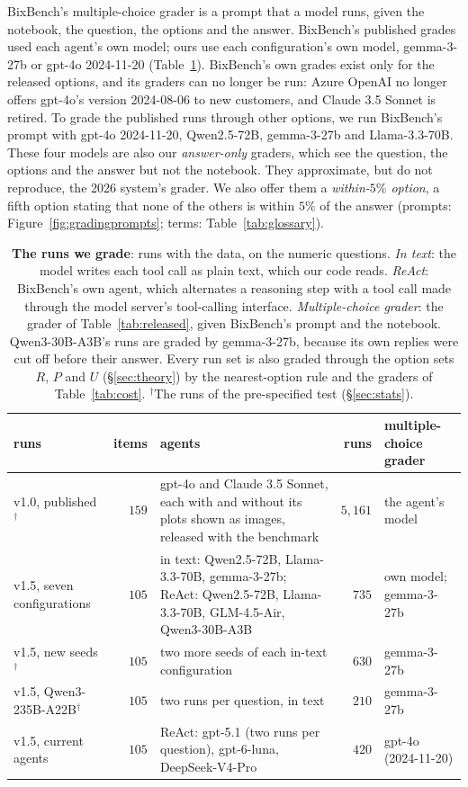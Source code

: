 \documentclass{article}
\begin{document}
BixBench's multiple-choice grader is a prompt that a model runs, given the notebook, the question, the options and the
answer. BixBench's published grades used each agent's own model; ours use each configuration's own model,
gemma-3-27b or gpt-4o 2024-11-20 (Table~\ref{tab:runs}). BixBench's own grades exist only for the released options,
and its graders can no longer be run: Azure OpenAI no longer offers gpt-4o's version 2024-08-06 to new customers,
and Claude 3.5 Sonnet is retired. To grade the published runs through other options, we run BixBench's prompt with gpt-4o 2024-11-20,
Qwen2.5-72B, gemma-3-27b and Llama-3.3-70B. These four models are also our \emph{answer-only} graders, which see the
question, the options and the answer but not the notebook. They approximate, but do not reproduce, the 2026 system's
grader. We also offer them a \emph{within-$5\%$ option}, a fifth option stating that none of the others is within
$5\%$ of the answer (prompts: Figure~\ref{fig:gradingprompts}; terms: Table~\ref{tab:glossary}).

\begin{table}[t]
\centering\footnotesize\setlength{\tabcolsep}{3pt}
\caption{\textbf{The runs we grade}: runs with the data, on the numeric questions. \emph{In text}: the model writes
each tool call as plain text, which our code reads. \emph{ReAct}: BixBench's own agent, which alternates a reasoning
step with a tool call made through the model server's tool-calling interface. \emph{Multiple-choice grader}: the
grader of Table~\ref{tab:released}, given BixBench's prompt and the notebook. Qwen3-30B-A3B's runs are graded by
gemma-3-27b, because its own replies were cut off before their answer. Every run set is also graded through the
option sets $R$, $P$ and $U$ (\S\ref{sec:theory}) by the nearest-option rule and the graders of
Table~\ref{tab:cost}. $^{\dagger}$The runs of the pre-specified test (\S\ref{sec:stats}).}
\label{tab:runs}
\begin{tabularx}{\linewidth}{@{}lr>{\raggedright\arraybackslash}Xrl@{}}
\toprule
runs & items & agents & runs & multiple-choice grader\\
\midrule
v1.0, published$^{\dagger}$ & $159$ & gpt-4o and Claude 3.5 Sonnet, each with and without its plots shown as
images, released with the benchmark & $5{,}161$ & the agent's model\\
v1.5, seven configurations & $105$ & in text: Qwen2.5-72B, Llama-3.3-70B, gemma-3-27b; ReAct: Qwen2.5-72B,
Llama-3.3-70B, GLM-4.5-Air, Qwen3-30B-A3B & $735$ & own model; gemma-3-27b\\
v1.5, new seeds$^{\dagger}$ & $105$ & two more seeds of each in-text configuration & $630$ & gemma-3-27b\\
v1.5, Qwen3-235B-A22B$^{\dagger}$ & $105$ & two runs per question, in text & $210$ & gemma-3-27b\\
v1.5, current agents & $105$ & ReAct: gpt-5.1 (two runs per question), gpt-6-luna, DeepSeek-V4-Pro & $420$ & gpt-4o
(2024-11-20)\\
\bottomrule
\end{tabularx}
\end{table}
\end{document}
